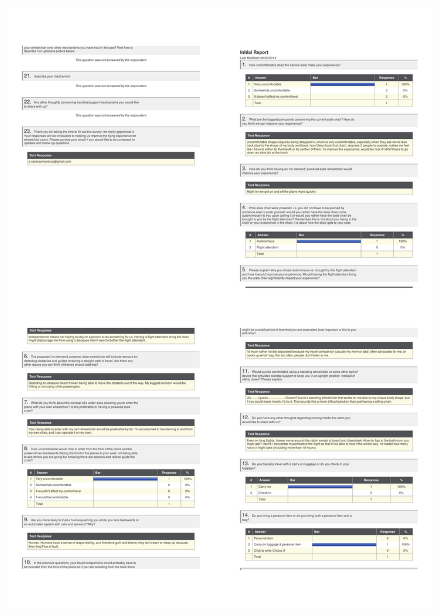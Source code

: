 \begin{figure}[h]
  \centering
     \includegraphics[scale=0.75]{images/Response2.pdf}
 \label{fig:Response2}
\end{figure}

